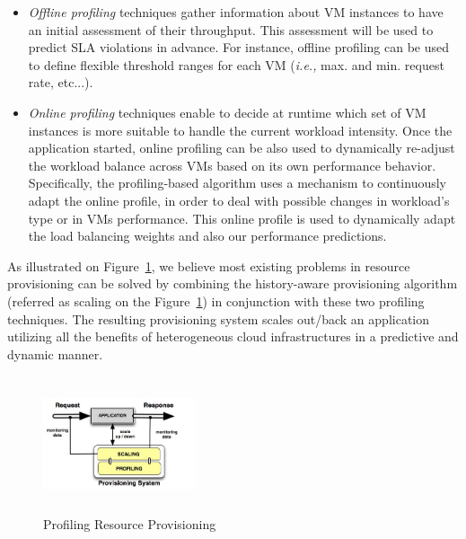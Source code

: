\begin{itemize}
\item \emph{Offline profiling} techniques gather information about VM instances to have an initial assessment of their throughput. This assessment will be used to predict SLA violations in advance. For instance, offline profiling can be used to define flexible threshold ranges for each VM (\emph{i.e.,} max. and min. request rate, etc...).

\item \emph{Online profiling} techniques enable to decide at runtime which set of VM instances is more suitable to handle the current workload intensity. Once the application started, online profiling can be also used to dynamically re-adjust the workload balance across VMs based on its own performance behavior. Specifically,  the profiling-based algorithm uses a mechanism to continuously adapt the online profile, in order to deal with possible changes in workload's type or in VMs performance. This online profile is used to dynamically adapt the load balancing weights and also our performance predictions. 

\end{itemize}

As illustrated on Figure~\ref{model}, we believe most existing problems in resource provisioning can be solved by combining the history-aware provisioning algorithm (referred as scaling on the Figure~\ref{model}) in conjunction with these two profiling techniques. The resulting provisioning system scales out/back an application utilizing all the benefits of heterogeneous cloud infrastructures in a predictive and dynamic manner.



\begin{figure}
\begin{center}
\includegraphics[width=0.4\textwidth, height=4cm]{./images/monitoringSchema.jpg}
\end{center}
\label{model}
\caption{Profiling Resource Provisioning}
\end{figure}
